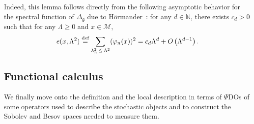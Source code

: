 \documentclass[AHL,Unicode,longabstracts,published]{cedram}
\newcommand{\N}{\mathbb{N}}
\newcommand{\deff}{\overset{\textup{def}}{=}}
\newcommand{\M}{\mathcal{M}}
\newcommand{\g}{\mathfrak{g}}
\newcommand{\Ld}{\Lambda}
\newcommand{\Dlg}{\Delta_{\g}}
\begin{document}
Indeed, this lemma follows directly from the following asymptotic behavior for the spectral function of $\Dlg$ due to H\"ormander~\cite{Hormander}: for any $d\in\N$, there exists $c_d>0$ such that for any $\Ld\geq 0$ and $x\in\M$,
\begin{equation*}
e(x,\Ld^2) \deff \sum_{\lambda_n^2\,\leq\,\Ld^2}(\varphi_n(x))^2 = c_d\Ld^d + O\left(\Ld^{d-1}\right).
\end{equation*}


\subsection{Functional calculus} 
We finally move onto the definition and the local description in terms of $\Psi$DOs of some operators used to describe the stochastic objects and to construct the Sobolev and Besov spaces needed to measure them.
\end{document}
